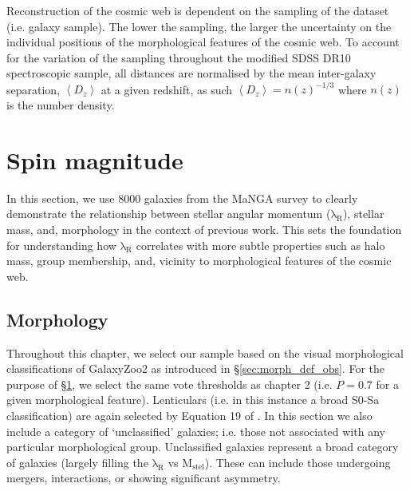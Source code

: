 Reconstruction of the cosmic web is dependent on the sampling of the dataset (i.e. galaxy sample). The lower the sampling, the larger the uncertainty on the individual positions of the morphological features of the cosmic web. To account for the variation of the sampling throughout the modified SDSS DR10 spectroscopic sample, all distances are normalised by the mean inter-galaxy separation, $\left\langle D_z \right\rangle$ at a given redshift, as such $\left\langle D_z \right\rangle = n(z)^{-1/3}$ where $n(z)$ is the number density. 

\section{Spin magnitude} \label{sec:spin_magnitude}
In this section, we use 8000 galaxies from the MaNGA survey to clearly demonstrate the relationship between stellar angular momentum ($\mathrm{\lambda_R}$), stellar mass, and, morphology in the context of previous work. This sets the foundation for understanding how $\mathrm{\lambda_R}$ correlates with more subtle properties such as halo mass, group membership, and, vicinity to morphological features of the cosmic web.

\subsection{Morphology}
Throughout this chapter, we select our sample based on the visual morphological classifications of GalaxyZoo2 \citep[GZ2][]{willett2013} as introduced in \S\ref{sec:morph_def_obs}. For the purpose of \S\ref{sec:spin_magnitude}, we select the same vote thresholds as chapter 2 (i.e. $P = 0.7$ for a given morphological feature). Lenticulars (i.e. in this instance a broad S0-Sa classification) are again selected by Equation 19 of \citet{willett2013}. In this section we also include a category of `unclassified' galaxies; i.e. those not associated with any particular morphological group. Unclassified galaxies represent a broad category of galaxies (largely filling the $\mathrm{\lambda_R}$ vs $\mathrm{M_{stel}}$). These can include those undergoing mergers, interactions, or showing significant asymmetry. 

